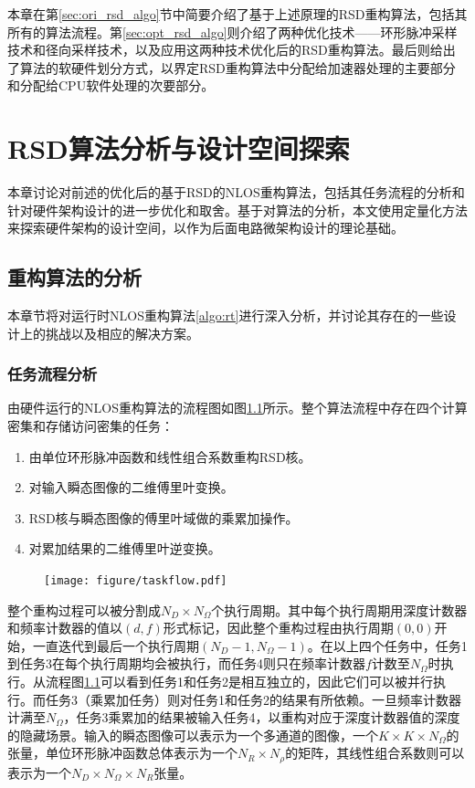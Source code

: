 \documentclass[master]{shtthesis}             %
\begin{document}
本章在第\ref{sec:ori_rsd_algo}节中简要介绍了基于上述原理的RSD重构算法，包括其所有的算法流程。第\ref{sec:opt_rsd_algo}则介绍了两种优化技术——环形脉冲采样技术和径向采样技术，以及应用这两种技术优化后的RSD重构算法。最后则给出了算法的软硬件划分方式，以界定RSD重构算法中分配给加速器处理的主要部分和分配给CPU软件处理的次要部分。

\chapter{RSD算法分析与设计空间探索}
本章讨论对前述的优化后的基于RSD的NLOS重构算法，包括其任务流程的分析和针对硬件架构设计的进一步优化和取舍。基于对算法的分析，本文使用定量化方法来探索硬件架构的设计空间，以作为后面电路微架构设计的理论基础。

\section{重构算法的分析} \label{sec:algo_analysis}
本章节将对运行时NLOS重构算法\ref{algo:rt}进行深入分析，并讨论其存在的一些设计上的挑战以及相应的解决方案。

\subsection{任务流程分析}
由硬件运行的NLOS重构算法的流程图如图\ref{fig:tsk_flow}所示。整个算法流程中存在四个计算密集和存储访问密集的任务：
\begin{enumerate}
  \item 由单位环形脉冲函数和线性组合系数重构RSD核。
  \item 对输入瞬态图像的二维傅里叶变换。
  \item RSD核与瞬态图像的傅里叶域做的乘累加操作。
  \item 对累加结果的二维傅里叶逆变换。
\end{enumerate}
\begin{figure}[!tb]
    \centering
    \texttt{[image: figure/taskflow.pdf]}
    \label{fig:tsk_flow}
\end{figure}

整个重构过程可以被分割成$N_D\times N_\Omega$个执行周期。其中每个执行周期用深度计数器和频率计数器的值以$(d,f)$形式标记，因此整个重构过程由执行周期$(0,0)$开始，一直迭代到最后一个执行周期$(N_D-1,N_\Omega-1)$。在以上四个任务中，任务1到任务3在每个执行周期均会被执行，而任务4则只在频率计数器$f$计数至$N_\Omega$时执行。从流程图\ref{fig:tsk_flow}可以看到任务1和任务2是相互独立的，因此它们可以被并行执行。而任务3（乘累加任务）则对任务1和任务2的结果有所依赖。一旦频率计数器计满至$N_\Omega$，任务3乘累加的结果被输入任务4，以重构对应于深度计数器值的深度的隐藏场景。输入的瞬态图像可以表示为一个多通道的图像，一个$K\times K\times N_\Omega$的张量，单位环形脉冲函数总体表示为一个$N_R\times N_\rho$的矩阵，其线性组合系数则可以表示为一个$N_D\times N_\Omega\times N_R$张量。
\end{document}
